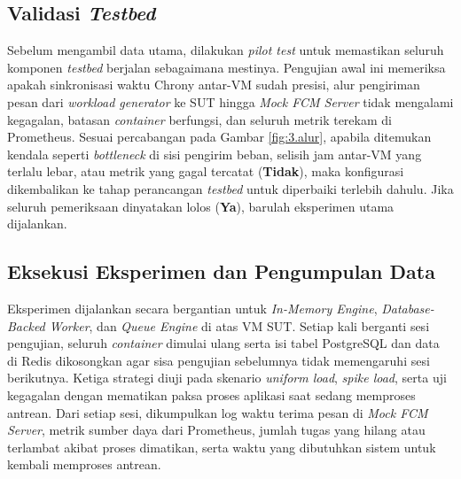 \subsection{Validasi \textit{Testbed}} \label{III.Langkah 5}
Sebelum mengambil data utama, dilakukan \textit{pilot test} untuk memastikan seluruh komponen \textit{testbed} berjalan sebagaimana mestinya. Pengujian awal ini memeriksa apakah sinkronisasi waktu Chrony antar-VM sudah presisi, alur pengiriman pesan dari \textit{workload generator} ke SUT hingga \textit{Mock FCM Server} tidak mengalami kegagalan, batasan \textit{container} berfungsi, dan seluruh metrik terekam di Prometheus. Sesuai percabangan pada Gambar \ref{fig:3.alur}, apabila ditemukan kendala seperti \textit{bottleneck} di sisi pengirim beban, selisih jam antar-VM yang terlalu lebar, atau metrik yang gagal tercatat (\textbf{Tidak}), maka konfigurasi dikembalikan ke tahap perancangan \textit{testbed} untuk diperbaiki terlebih dahulu. Jika seluruh pemeriksaan dinyatakan lolos (\textbf{Ya}), barulah eksperimen utama dijalankan. \par

\subsection{Eksekusi Eksperimen dan Pengumpulan Data} \label{III.Langkah 6}
Eksperimen dijalankan secara bergantian untuk \textit{In-Memory Engine}, \textit{Database-Backed Worker}, dan \textit{Queue Engine} di atas VM SUT. Setiap kali berganti sesi pengujian, seluruh \textit{container} dimulai ulang serta isi tabel PostgreSQL dan data di Redis dikosongkan agar sisa pengujian sebelumnya tidak memengaruhi sesi berikutnya. Ketiga strategi diuji pada skenario \textit{uniform load}, \textit{spike load}, serta uji kegagalan dengan mematikan paksa proses aplikasi saat sedang memproses antrean. Dari setiap sesi, dikumpulkan log waktu terima pesan di \textit{Mock FCM Server}, metrik sumber daya dari Prometheus, jumlah tugas yang hilang atau terlambat akibat proses dimatikan, serta waktu yang dibutuhkan sistem untuk kembali memproses antrean. \par

